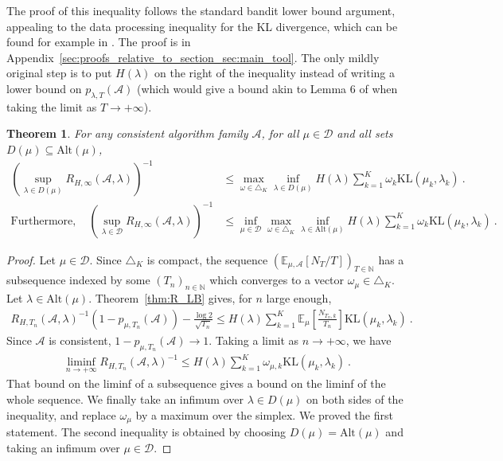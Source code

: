 \documentclass{article}
\newcommand{\KL}{\mathrm{KL}}
\newcommand{\alt}{\mathrm{Alt}}
\newtheorem{theorem}{Theorem}
\begin{document}
The proof of this inequality follows the standard bandit lower bound argument, appealing to the data processing inequality for the KL divergence, which can be found for example in \cite{garivier2019explore}.
The proof is in Appendix~\ref{sec:proofs_relative_to_section_sec:main_tool}.
The only mildly original step is to put $H(\lambda)$ on the right of the inequality instead of writing a lower bound on $p_{\lambda, T}(\mathcal A)$ (which would give a bound akin to Lemma 6 of \cite{barrier2022best} when taking the limit as $T \to + \infty$).

\begin{theorem}\label{thm:asm_R_LB_limsup}
For any consistent algorithm family $\mathcal A$, for all $\mu \in \mathcal D$ and all sets $D(\mu) \subseteq \alt(\mu)$,
\begin{align*}
(\sup_{\lambda \in D(\mu)} R_{H,\infty}(\mathcal A, \lambda))^{-1}
&\le \max_{\omega \in \triangle_K} \inf_{\lambda \in D(\mu)} H(\lambda)\sum_{k=1}^K \omega_k \KL(\mu_k, \lambda_k)
\: .
\\
\text{Furthermore}, \quad(\sup_{\lambda \in \mathcal D} R_{H,\infty}(\mathcal A, \lambda))^{-1}
&\le \inf_{\mu \in \mathcal D} \max_{\omega \in \triangle_K} \inf_{\lambda \in \alt(\mu)} H(\lambda)\sum_{k=1}^K \omega_k \KL(\mu_k, \lambda_k)
\: .
\end{align*}
\end{theorem}
\begin{proof}
Let $\mu \in \mathcal D$. Since $\triangle_K$ is compact, the sequence $(\mathbb{E}_{\mu, \mathcal A}[N_{T}/T])_{T \in \mathbb{N}}$ has a subsequence indexed by some $(T_n)_{n \in \mathbb{N}}$ which converges to a vector $\omega_{\mu} \in \triangle_K$. Let $\lambda \in \alt(\mu)$. Theorem~\ref{thm:R_LB} gives, for $n$ large enough,
\begin{align*}
R_{H,T_n}(\mathcal A, \lambda)^{-1} (1 - p_{\mu, T_n}(\mathcal A)) - \frac{\log 2}{\sqrt{T_n}}
\le H(\lambda)\sum_{k=1}^K \mathbb{E}_\mu[\frac{N_{T_n,k}}{T_n}] \KL(\mu_k, \lambda_k)
\: .
\end{align*}
Since $\mathcal A$ is consistent, $1 - p_{\mu, T_n}(\mathcal A) \to 1$. Taking a limit as $n \to +\infty$, we have
\begin{align*}
\liminf_{n \to + \infty} R_{H,T_n}(\mathcal A, \lambda)^{-1}
\le H(\lambda)\sum_{k=1}^K \omega_{\mu, k} \KL(\mu_k, \lambda_k)
\: .
\end{align*}
That bound on the liminf of a subsequence gives a bound on the liminf of the whole sequence. We finally take an infimum over $\lambda \in D(\mu)$ on both sides of the inequality, and replace $\omega_{\mu}$ by a maximum over the simplex. We proved the first statement. The second inequality is obtained by choosing $D(\mu) = \alt(\mu)$ and taking an infimum over $\mu \in \mathcal D$.
\end{proof}
\end{document}
